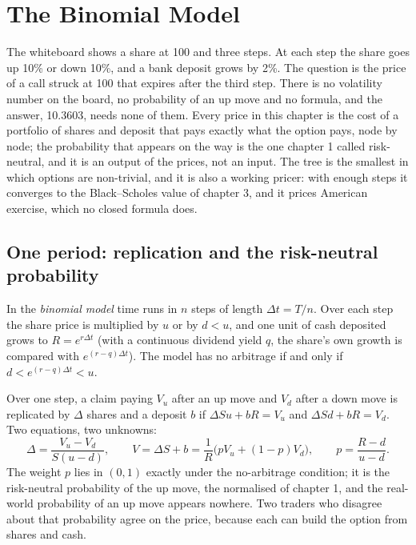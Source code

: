 \chapter{The Binomial Model}\label{ch:dv:the-binomial-model}

The whiteboard shows a share at 100 and three steps. At each step the share
goes up 10\% or down 10\%, and a bank deposit grows by 2\%. The question is the
price of a call struck at 100 that expires after the third step. There is no
volatility number on the board, no probability of an up move and no formula,
and the answer, 10.3603, needs none of them. Every price in this chapter is the
cost of a portfolio of shares and deposit that pays exactly what the option
pays, node by node; the probability that appears on the way is the one
chapter 1 called risk-neutral, and it is an output of the prices, not an input.
The tree is the smallest  in which options are non-trivial,
and it is also a working pricer: with enough steps it converges to the
Black--Scholes value of chapter 3, and it prices American exercise, which no
closed formula does.

\section{One period: replication and the risk-neutral probability}

\begin{definition}\label{def:dv:the-binomial-model:binomial}
In the \emph{binomial model} time runs in $n$ steps of
length $\Delta t=T/n$. Over each step the share price is multiplied by $u$ or by
$d<u$, and one unit of cash deposited grows to $R=e^{r\Delta t}$ (with a
continuous dividend yield $q$, the share's own growth is compared with
$e^{(r-q)\Delta t}$). The model has no arbitrage if and only if
$d<e^{(r-q)\Delta t}<u$.
\end{definition}

Over one step, a claim paying $V_u$ after an up move and $V_d$ after a down move
is replicated by $\Delta$ shares and a deposit $b$ if $\Delta S u+bR=V_u$ and
$\Delta Sd+bR=V_d$. Two equations, two unknowns:
\begin{equation}\label{eq:dv:the-binomial-model:onestep}
\Delta=\frac{V_u-V_d}{S(u-d)},\qquad
V=\Delta S+b=\frac{1}{R}\bigl(pV_u+(1-p)V_d\bigr),\qquad p=\frac{R-d}{u-d}.
\end{equation}
The weight $p$ lies in $(0,1)$ exactly under the no-arbitrage condition; it is
the risk-neutral probability of the up move, the normalised  of
chapter 1, and the real-world probability of an up move appears nowhere. Two
traders who disagree about that probability agree on the price, because each can
build the option from shares and cash.

